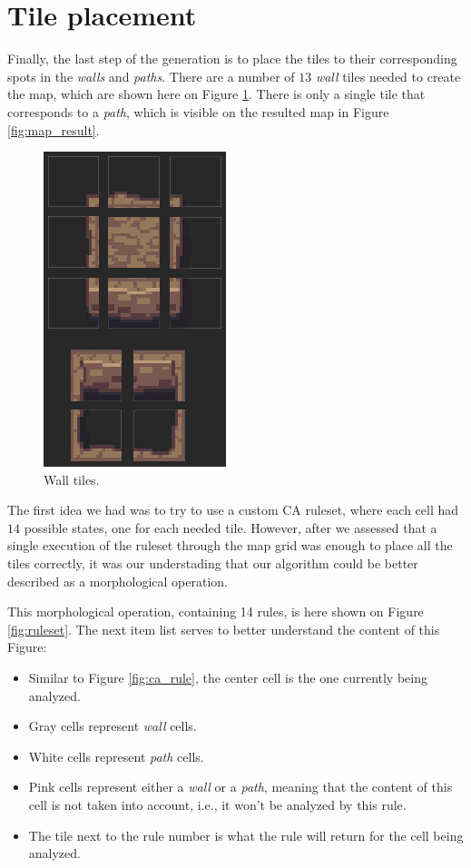 \section{Tile placement}

Finally, the last step of the generation is to place the tiles to their corresponding spots in the \emph{walls} and \emph{paths}. There are a number of \(13\) \emph{wall} tiles needed to create the map, which are shown here on Figure \ref{fig:wall_tiles}. There is only a single tile that corresponds to a \emph{path}, which is visible on the resulted map in Figure \ref{fig:map_result}.

\begin{figure}[h]
    \caption{Wall tiles.}
    \centerline{\includegraphics{images/development/wall_tiles.png}}
    \label{fig:wall_tiles}
\end{figure}

The first idea we had was to try to use a custom CA ruleset, where each cell had \(14\) possible states, one for each needed tile. However, after we assessed that a single execution of the ruleset through the map grid was enough to place all the tiles correctly, it was our understading that our algorithm could be better described as a morphological operation.

This morphological operation, containing 14 rules, is here shown on Figure \ref{fig:ruleset}. The next item list serves to better understand the content of this Figure:

\begin{itemize}
    \item Similar to Figure \ref{fig:ca_rule}, the center cell is the one currently being analyzed.
    \item Gray cells represent \emph{wall} cells.
    \item White cells represent \emph{path} cells.
    \item Pink cells represent either a \emph{wall} or a \emph{path}, meaning that the content of this cell is not taken into account, i.e., it won't be analyzed by this rule.
    \item The tile next to the rule number is what the rule will return for the cell being analyzed. 
\end{itemize}

